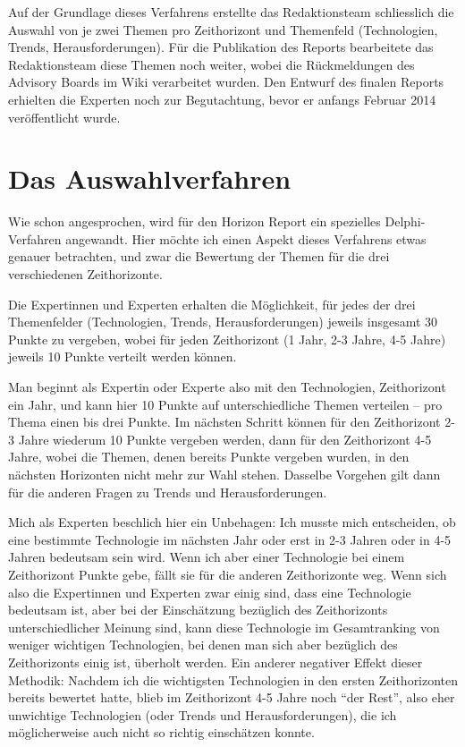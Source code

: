 \documentclass[a4paper,
fontsize=11pt,
oneside,
numbers=noperiodatend,
parskip=half-,
bibliography=totoc,
final
]{scrartcl}
\begin{document}
Auf der Grundlage dieses Verfahrens erstellte das Redaktionsteam
schliesslich die Auswahl von je zwei Themen pro Zeithorizont und
Themenfeld (Technologien, Trends, Herausforderungen). Für die
Publikation des Reports bearbeitete das Redaktionsteam diese Themen noch
weiter, wobei die Rückmeldungen des Advisory Boards im Wiki verarbeitet
wurden. Den Entwurf des finalen Reports erhielten die Experten noch zur
Begutachtung, bevor er anfangs Februar 2014 veröffentlicht wurde.

\section*{Das Auswahlverfahren}\label{das-auswahlverfahren}

Wie schon angesprochen, wird für den Horizon Report ein spezielles
Delphi-Verfahren angewandt. Hier möchte ich einen Aspekt dieses
Verfahrens etwas genauer betrachten, und zwar die Bewertung der Themen
für die drei verschiedenen Zeithorizonte.

Die Expertinnen und Experten erhalten die Möglichkeit, für jedes der
drei Themenfelder (Technologien, Trends, Herausforderungen) jeweils
insgesamt 30 Punkte zu vergeben, wobei für jeden Zeithorizont (1 Jahr,
2-3 Jahre, 4-5 Jahre) jeweils 10 Punkte verteilt werden können.~

Man beginnt als Expertin oder Experte also mit den Technologien,
Zeithorizont ein Jahr, und kann hier 10 Punkte auf unterschiedliche
Themen verteilen -- pro Thema einen bis drei Punkte. Im nächsten Schritt
können für den Zeithorizont 2-3 Jahre wiederum 10 Punkte vergeben
werden, dann für den Zeithorizont 4-5 Jahre, wobei die Themen, denen
bereits Punkte vergeben wurden, in den nächsten Horizonten nicht mehr
zur Wahl stehen. Dasselbe Vorgehen gilt dann für die anderen Fragen zu
Trends und Herausforderungen.

Mich als Experten beschlich hier ein Unbehagen: Ich musste mich
entscheiden, ob eine bestimmte Technologie im nächsten Jahr oder erst in
2-3 Jahren oder in 4-5 Jahren bedeutsam sein wird. Wenn ich aber einer
Technologie bei einem Zeithorizont Punkte gebe, fällt sie für die
anderen Zeithorizonte weg. Wenn sich also die Expertinnen und Experten
zwar einig sind, dass eine Technologie bedeutsam ist, aber bei der
Einschätzung bezüglich des Zeithorizonts unterschiedlicher Meinung sind,
kann diese Technologie im Gesamtranking von weniger wichtigen
Technologien, bei denen man sich aber bezüglich des Zeithorizonts einig
ist, überholt werden. Ein anderer negativer Effekt dieser Methodik:
Nachdem ich die wichtigsten Technologien in den ersten Zeithorizonten
bereits bewertet hatte, blieb im Zeithorizont 4-5 Jahre noch
\enquote{der Rest}, also eher unwichtige Technologien (oder Trends und
Herausforderungen), die ich möglicherweise auch nicht so richtig
einschätzen konnte.~
\end{document}
